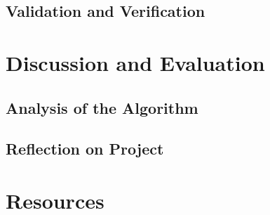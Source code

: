 \section{Validation and Verification}

\chapter{Discussion and Evaluation}
\section{Analysis of the Algorithm}

\section{Reflection on Project}

\chapter{Resources}

\nocite{*}

